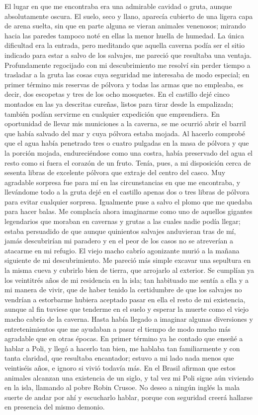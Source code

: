 \documentclass{novela}
\begin{document}
    El lugar en que me encontraba era una admirable cavidad o gruta, aunque absolutamente oscura. El suelo, seco y llano, aparecía cubierto de una ligera capa de arena suelta, sin que en parte alguna se vieran animales venenosos; mirando hacia las paredes tampoco noté en ellas la menor huella de humedad. La única dificultad era la entrada, pero meditando que aquella caverna podía ser el sitio indicado para estar a salvo de los salvajes, me pareció que resultaba una ventaja. Profundamente regocijado con mi descubrimiento me resolví sin perder tiempo a trasladar a la gruta las cosas cuya seguridad me interesaba de modo especial; en primer término mis reservas de pólvora y todas las armas que no empleaba, es decir, dos escopetas y tres de los ocho mosquetes. En el castillo dejé cinco montados en las ya descritas cureñas, listos para tirar desde la empalizada; también podían servirme en cualquier expedición que emprendiera.
    En oportunidad de llevar mis municiones a la caverna, se me ocurrió abrir el barril que había salvado del mar y cuya pólvora estaba mojada. Al hacerlo comprobé que el agua había penetrado tres o cuatro pulgadas en la masa de pólvora y que la porción mojada, endureciéndose como una costra, había preservado del agua el resto como si fuera el corazón de un fruto. Tenía, pues, a mi disposición cerca de sesenta libras de excelente pólvora que extraje del centro del casco. Muy agradable sorpresa fue para mí en las circunstancias en que me encontraba, y llevándome todo a la gruta dejé en el castillo apenas dos o tres libras de pólvora para evitar cualquier sorpresa. Igualmente puse a salvo el plomo que me quedaba para hacer balas.
    Me complacía ahora imaginarme como uno de aquellos gigantes legendarios que moraban en cavernas y grutas a las cuales nadie podía llegar; estaba persuadido de que aunque quinientos salvajes anduvieran tras de mí, jamás descubrirían mi paradero y en el peor de los casos no se atreverían a atacarme en mi refugio.
    El viejo macho cabrío agonizante murió a la mañana siguiente de mi descubrimiento. Me pareció más simple excavar una sepultura en la misma cueva y cubrirlo bien de tierra, que arrojarlo al exterior.
    Se cumplían ya los veintitrés años de mi residencia en la isla; tan habituado me sentía a ella y a mi manera de vivir, que de haber tenido la certidumbre de que los salvajes no vendrían a estorbarme hubiera aceptado pasar en ella el resto de mi existencia, aunque al fin tuviese que tenderme en el suelo y esperar la muerte como el viejo macho cabrío de la caverna. Hasta había llegado a imaginar algunas diversiones y entretenimientos que me ayudaban a pasar el tiempo de modo mucho más agradable que en otras épocas. En primer término ya he contado que enseñé a hablar a Poli, y llegó a hacerlo tan bien, me hablaba tan familiarmente y con tanta claridad, que resultaba encantador; estuvo a mi lado nada menos que veintiséis años, e ignoro si vivió todavía más. En el Brasil afirman que estos animales alcanzan una existencia de un siglo, y tal vez mi Poli sigue aún viviendo en la isla, llamando al pobre Robin Crusoe. No deseo a ningún inglés la mala suerte de andar por ahí y escucharlo hablar, porque con seguridad creerá hallarse en presencia del mismo demonio.
\end{document}

